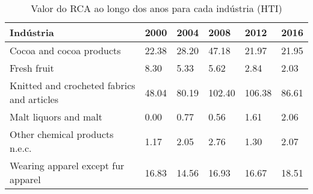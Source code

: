 \begin{table}
\centering
\caption{Valor do RCA ao longo dos anos para cada indústria (HTI)}
\label{tab:ex3-tempo-HTI}
\begin{tabular}{p{6cm}p{1.5cm}p{1.5cm}p{1.5cm}p{1.5cm}p{1.5cm}}
\toprule
                                 Indústria &  2000 &  2004 &   2008 &   2012 &  2016 \\
\midrule
                  Cocoa and cocoa products & 22.38 & 28.20 &  47.18 &  21.97 & 21.95 \\
                               Fresh fruit &  8.30 &  5.33 &   5.62 &   2.84 &  2.03 \\
Knitted and crocheted fabrics and articles & 48.04 & 80.19 & 102.40 & 106.38 & 86.61 \\
                     Malt liquors and malt &  0.00 &  0.77 &   0.56 &   1.61 &  2.06 \\
            Other chemical products n.e.c. &  1.17 &  2.05 &   2.76 &   1.30 &  2.07 \\
        Wearing apparel except fur apparel & 16.83 & 14.56 &  16.93 &  16.67 & 18.51 \\
\bottomrule
\end{tabular}
\end{table}
